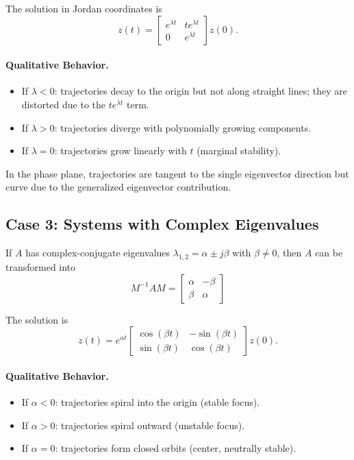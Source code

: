 The solution in Jordan coordinates is
\begin{equation}
z(t) =
\begin{bmatrix}
e^{\lambda t} & t e^{\lambda t} \\
0 & e^{\lambda t}
\end{bmatrix} z(0).
\end{equation}

\paragraph{Qualitative Behavior.}
\begin{itemize}
    \item If $\lambda < 0$: trajectories decay to the origin but not along straight lines; they are distorted due to the $t e^{\lambda t}$ term.
    \item If $\lambda > 0$: trajectories diverge with polynomially growing components.
    \item If $\lambda = 0$: trajectories grow linearly with $t$ (marginal stability).
\end{itemize}

In the phase plane, trajectories are tangent to the single eigenvector direction but curve due to the generalized eigenvector contribution.

\subsection{Case 3: Systems with Complex Eigenvalues}

If $A$ has complex-conjugate eigenvalues $\lambda_{1,2} = \alpha \pm j\beta$ with $\beta \neq 0$, then $A$ can be transformed into
\begin{equation}
\boxed{
M^{-1} A M =
\begin{bmatrix}
\alpha & -\beta \\
\beta & \alpha
\end{bmatrix}}
\end{equation}

The solution is
\begin{equation}
z(t) = e^{\alpha t}
\begin{bmatrix}
\cos(\beta t) & -\sin(\beta t) \\
\sin(\beta t) & \cos(\beta t)
\end{bmatrix} z(0).
\end{equation}

\paragraph{Qualitative Behavior.}
\begin{itemize}
    \item If $\alpha < 0$: trajectories spiral into the origin (stable focus).
    \item If $\alpha > 0$: trajectories spiral outward (unstable focus).
    \item If $\alpha = 0$: trajectories form closed orbits (center, neutrally stable).
\end{itemize}

